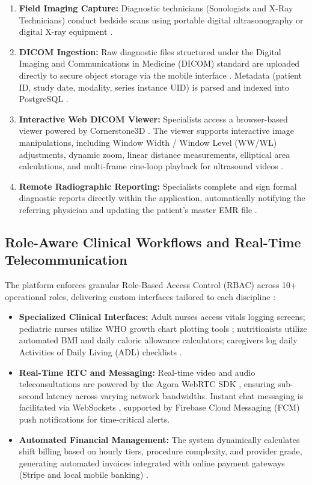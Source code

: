\documentclass[lettersize,onecolumn,journal]{IEEEtran}
\begin{document}
	\begin{enumerate}
		\item \textbf{Field Imaging Capture:} Diagnostic technicians (Sonologists and X-Ray Technicians) conduct bedside scans using portable digital ultrasonography or digital X-ray equipment \cite{dicom2021}.
		\item \textbf{DICOM Ingestion:} Raw diagnostic files structured under the Digital Imaging and Communications in Medicine (DICOM) standard are uploaded directly to secure object storage via the mobile interface \cite{dicom2021, pacs2001}. Metadata (patient ID, study date, modality, series instance UID) is parsed and indexed into PostgreSQL \cite{dicom2021}.
		\item \textbf{Interactive Web DICOM Viewer:} Specialists access a browser-based viewer powered by Cornerstone3D \cite{cornerstone3d}. The viewer supports interactive image manipulations, including Window Width / Window Level (WW/WL) adjustments, dynamic zoom, linear distance measurements, elliptical area calculations, and multi-frame cine-loop playback for ultrasound videos \cite{cornerstone3d}.
		\item \textbf{Remote Radiographic Reporting:} Specialists complete and sign formal diagnostic reports directly within the application, automatically notifying the referring physician and updating the patient's master EMR file \cite{pacs2001}.
	\end{enumerate}
	
	\subsection{Role-Aware Clinical Workflows and Real-Time Telecommunication}
	The platform enforces granular Role-Based Access Control (RBAC) across 10+ operational roles, delivering custom interfaces tailored to each discipline \cite{rbac_standard}:
	
	\begin{itemize}
		\item \textbf{Specialized Clinical Interfaces:} Adult nurses access vitals logging screens; pediatric nurses utilize WHO growth chart plotting tools \cite{who_child_growth}; nutritionists utilize automated BMI and daily caloric allowance calculators; caregivers log daily Activities of Daily Living (ADL) checklists \cite{srs2026}.
		\item \textbf{Real-Time RTC and Messaging:} Real-time video and audio teleconsultations are powered by the Agora WebRTC SDK \cite{agorawebrtc}, ensuring sub-second latency across varying network bandwidths. Instant chat messaging is facilitated via WebSockets \cite{fette2011websocket}, supported by Firebase Cloud Messaging (FCM) push notifications for time-critical alerts.
		\item \textbf{Automated Financial Management:} The system dynamically calculates shift billing based on hourly tiers, procedure complexity, and provider grade, generating automated invoices integrated with online payment gateways (Stripe and local mobile banking) \cite{stripe2024api}.
	\end{itemize}
	
\end{document}
